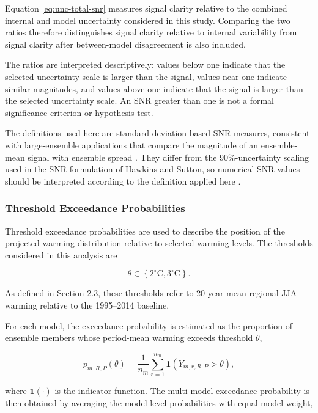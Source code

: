 \documentclass[
]{krantz}
\begin{document}
Equation \eqref{eq:unc-total-snr} measures signal clarity relative to the combined internal and model uncertainty considered in this study. Comparing the two ratios therefore distinguishes signal clarity relative to internal variability from signal clarity after between-model disagreement is also included.

The ratios are interpreted descriptively: values below one indicate that the selected uncertainty scale is larger than the signal, values near one indicate similar magnitudes, and values above one indicate that the signal is larger than the selected uncertainty scale. An SNR greater than one is not a formal significance criterion or hypothesis test.

The definitions used here are standard-deviation-based SNR measures, consistent with large-ensemble applications that compare the magnitude of an ensemble-mean signal with ensemble spread \citep{McKinnon2018, McKinnon2021}. They differ from the 90\%-uncertainty scaling used in the SNR formulation of Hawkins and Sutton, so numerical SNR values should be interpreted according to the definition applied here \citep{Hawkins2009}.

\subsubsection{Threshold Exceedance Probabilities}\label{threshold-exceedance-probabilities}

Threshold exceedance probabilities are used to describe the position of the projected warming distribution relative to selected warming levels. The thresholds considered in this analysis are

\[
\theta
\in
\left\{
2^\circ\mathrm{C},
3^\circ\mathrm{C}
\right\}.
\]

As defined in Section 2.3, these thresholds refer to 20-year mean regional JJA warming relative to the 1995--2014 baseline.

For each model, the exceedance probability is estimated as the proportion of ensemble members whose period-mean warming exceeds threshold \(\theta\),

\begin{equation}
p_{m,R,P}(\theta)
=
\frac{1}{n_m}
\sum_{r=1}^{n_m}
\mathbf{1}
\left(
Y_{m,r,R,P}>\theta
\right),
\label{eq:unc-model-threshold-probability}
\end{equation}

where \(\mathbf{1}(\cdot)\) is the indicator function. The multi-model exceedance probability is then obtained by averaging the model-level probabilities with equal model weight,
\end{document}
